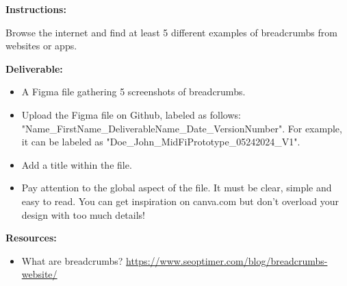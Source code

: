 \makeheaderfiles

\textbf{Instructions:}

Browse the internet and find at least 5 different examples of breadcrumbs from websites or apps.

\textbf{Deliverable:}

\begin{itemize}
\item A Figma file gathering 5 screenshots of breadcrumbs.
\item Upload the Figma file on Github, labeled as follows: "Name\_FirstName\_DeliverableName\_Date\_VersionNumber". For example, it can be labeled as "Doe\_John\_MidFiPrototype\_05242024\_V1".
\item Add a title within the file.
\item Pay attention to the global aspect of the file. It must be clear, simple and easy to read. You can get inspiration on canva.com but don't overload your design with too much details!
\end{itemize}

\textbf{Resources:}

\begin{itemize}
\item What are breadcrumbs? \url{https://www.seoptimer.com/blog/breadcrumbs-website/}
\end{itemize}

